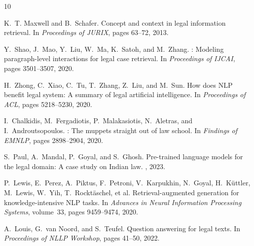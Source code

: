 \documentclass[11pt]{article}
\begin{document}

\begin{thebibliography}{10}

K.~T. Maxwell and B.~Schafer.
\newblock Concept and context in legal information retrieval.
\newblock In {\em Proceedings of JURIX}, pages 63--72, 2013.

Y.~Shao, J.~Mao, Y.~Liu, W.~Ma, K.~Satoh, and M.~Zhang.
: Modeling paragraph-level interactions for legal case retrieval.
\newblock In {\em Proceedings of IJCAI}, pages 3501--3507, 2020.

H.~Zhong, C.~Xiao, C.~Tu, T.~Zhang, Z.~Liu, and M.~Sun.
\newblock How does {NLP} benefit legal system: A summary of legal artificial intelligence.
\newblock In {\em Proceedings of ACL}, pages 5218--5230, 2020.

I.~Chalkidis, M.~Fergadiotis, P.~Malakasiotis, N.~Aletras, and I.~Androutsopoulos.
: The muppets straight out of law school.
\newblock In {\em Findings of EMNLP}, pages 2898--2904, 2020.

S.~Paul, A.~Mandal, P.~Goyal, and S.~Ghosh.
\newblock Pre-trained language models for the legal domain: A case study on {Indian} law.
, 2023.

P.~Lewis, E.~Perez, A.~Piktus, F.~Petroni, V.~Karpukhin, N.~Goyal, H.~K{\"u}ttler, M.~Lewis, W.~Yih, T.~Rockt{\"a}schel, et al.
\newblock Retrieval-augmented generation for knowledge-intensive {NLP} tasks.
\newblock In {\em Advances in Neural Information Processing Systems}, volume~33, pages 9459--9474, 2020.

A.~Louis, G.~van Noord, and S.~Teufel.
\newblock Question answering for legal texts.
\newblock In {\em Proceedings of NLLP Workshop}, pages 41--50, 2022.

\end{thebibliography}
\end{document}
